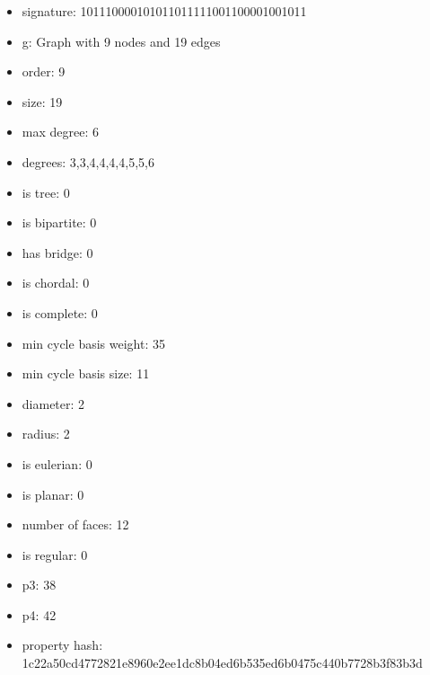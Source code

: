 \newpage
\begin{figure}
\end{figure}
\begin{itemize}
\item signature: 101110000101011011111001100001001011
\item g: Graph with 9 nodes and 19 edges
\item order: 9
\item size: 19
\item max degree: 6
\item degrees: 3,3,4,4,4,4,5,5,6
\item is tree: 0
\item is bipartite: 0
\item has bridge: 0
\item is chordal: 0
\item is complete: 0
\item min cycle basis weight: 35
\item min cycle basis size: 11
\item diameter: 2
\item radius: 2
\item is eulerian: 0
\item is planar: 0
\item number of faces: 12
\item is regular: 0
\item p3: 38
\item p4: 42
\item property hash: 1c22a50cd4772821e8960e2ee1dc8b04ed6b535ed6b0475c440b7728b3f83b3d
\end{itemize}
